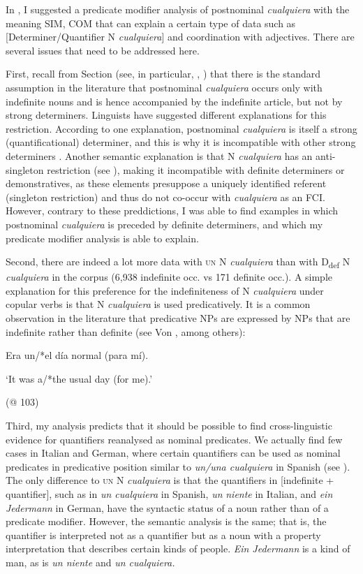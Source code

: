 \documentclass[output=paper]{langscibook}
\begin{document}
In , I suggested a predicate modifier analysis of postnominal \textit{cualquiera} with the meaning SIM, COM that can explain a certain type of data such as [Determiner/Quantifier N \textit{cualquiera}] and coordination with adjectives. There are several issues that need to be addressed here.

  First, recall from Section  (see, in particular, \citealt{Lapesa1974}, \citealt{Rivero2011}) that there is the standard assumption in the literature that postnominal \textit{cualquiera} occurs only with indefinite nouns and is hence accompanied by the indefinite article, but not by strong determiners. Linguists have suggested different explanations for this restriction. According to one explanation, postnominal \textit{cualquiera} is itself a strong (quantificational) determiner, and this is why it is incompatible with other strong determiners \citep{Lapesa1974}. Another semantic explanation is that N \textit{cualquiera} has an anti-singleton restriction (see \citealt{Menéndez-Benito2010}), making it incompatible with definite determiners or demonstratives, as these elements presuppose a uniquely identified referent (singleton restriction) and thus do not co-occur with \textit{cualquiera} as an FCI. However, contrary to these preddictions, I was able to find examples in which postnominal \textit{cualquiera} is preceded by definite determiners, and which my predicate modifier analysis is able to explain.

  Second, there are indeed a lot more data with \textsc{un} N \textit{cualquiera} than with D\textsubscript{def} N \textit{cualquiera} in the corpus (6,938 indefinite occ. vs 171 definite occ.). A simple explanation for this preference for the indefiniteness of N \textit{cualquiera} under copular verbs is that N \textit{cualquiera} is used predicatively. It is a common observation in the literature that predicative NPs are expressed by NPs that are indefinite rather than definite (see Von \citealt{GeenhovenMcNally2005}, among others): 

  Era un/*el día normal (para mí).

  ‘It was a/*the usual day (for me).’

  (@ 103)

Third, my analysis predicts that it should be possible to find cross-linguistic evidence for quantifiers reanalysed as nominal predicates. We actually find few cases in Italian and German, where certain quantifiers can be used as nominal predicates in predicative position similar to \textit{un/una cualquiera} in Spanish (see ). The only difference to \textsc{un} N \textit{cualquiera} is that the quantifiers in [indefinite + quantifier], such as in \textit{un cualquiera} in Spanish, \textit{un} \textit{niente} in Italian, and \textit{ein Jedermann} in German, have the syntactic status of a noun rather than of a predicate modifier. However, the semantic analysis is the same; that is, the quantifier is interpreted not as a quantifier but as a noun with a property interpretation that describes certain kinds of people. \textit{Ein Jedermann} is a kind of man, as is \textit{un niente} and \textit{un cualquiera.}
\end{document}
